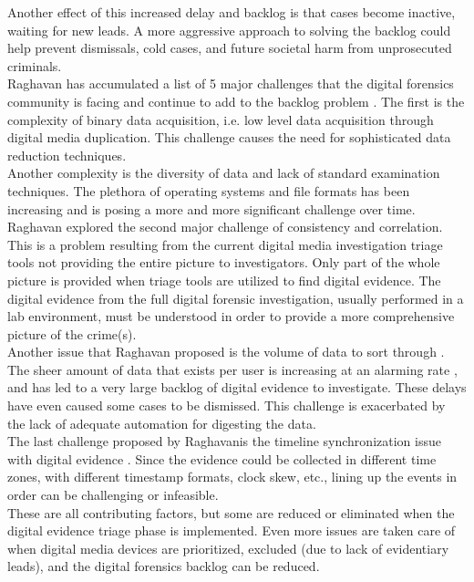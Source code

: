\documentclass[12pt]{article}
\begin{document}
Another effect of this increased delay and backlog is that cases become inactive,
waiting for new leads.  A more aggressive approach to solving the backlog could
help prevent dismissals, cold cases, and future societal harm from unprosecuted 
criminals.\\

Raghavan has accumulated a list of 5 major challenges
that the digital forensics community is facing and continue to add to the backlog
problem \cite{raghavan2013digital}.  The first is the complexity of binary data
acquisition, i.e. low level
data acquisition through digital media duplication.  This challenge causes the need
for sophisticated data reduction techniques.\\

Another complexity is the diversity of data and lack of standard examination
techniques.  The plethora of operating systems and file formats has been
increasing and is posing a more and more significant challenge over time.\\

Raghavan explored the second major challenge of consistency and correlation.  This is a
problem resulting from the current digital media investigation triage tools not
providing the entire picture to investigators.  Only part of the whole picture
is provided when triage tools are utilized to find digital evidence.  The
digital evidence from the full digital forensic investigation, usually performed 
in a lab environment, must be understood in order to provide a more comprehensive
picture of the crime(s).\\

Another issue that Raghavan proposed is the volume of data to sort
through \cite{raghavan2013digital}.  The sheer amount of data that exists per user is increasing
at an alarming rate \cite{rogers2006computer}, and has led to a very large backlog of digital
evidence to investigate.  These delays have even caused some cases to be dismissed.
This challenge is exacerbated by the lack of adequate automation for digesting the
data.\\

The last challenge proposed by Raghavanis the timeline synchronization issue with
digital evidence \cite{raghavan2013digital}.  Since the evidence could be
collected in different time zones, with different timestamp formats, clock skew,
etc., lining up the events in order can be challenging or infeasible.\\

These are all contributing factors, but some are reduced or eliminated when 
the digital evidence triage phase is implemented.  Even more issues are taken care
of when digital media devices are prioritized, excluded (due to lack of
evidentiary leads), and the digital forensics backlog can be reduced.\\
\end{document}
